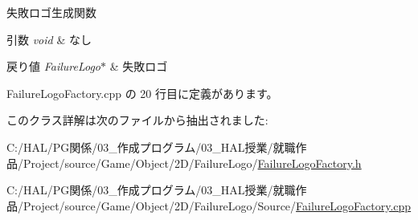 失敗ロゴ生成関数 


\begin{DoxyParams}{引数}
{\em void} & なし \\
\hline
\end{DoxyParams}

\begin{DoxyRetVals}{戻り値}
{\em Failure\+Logo$\ast$} & 失敗ロゴ \\
\hline
\end{DoxyRetVals}


 Failure\+Logo\+Factory.\+cpp の 20 行目に定義があります。



このクラス詳解は次のファイルから抽出されました\+:\begin{DoxyCompactItemize}
\item 
C\+:/\+H\+A\+L/\+P\+G関係/03\+\_\+作成プログラム/03\+\_\+\+H\+A\+L授業/就職作品/\+Project/source/\+Game/\+Object/2\+D/\+Failure\+Logo/\mbox{\hyperlink{_failure_logo_factory_8h}{Failure\+Logo\+Factory.\+h}}\item 
C\+:/\+H\+A\+L/\+P\+G関係/03\+\_\+作成プログラム/03\+\_\+\+H\+A\+L授業/就職作品/\+Project/source/\+Game/\+Object/2\+D/\+Failure\+Logo/\+Source/\mbox{\hyperlink{_failure_logo_factory_8cpp}{Failure\+Logo\+Factory.\+cpp}}\end{DoxyCompactItemize}
